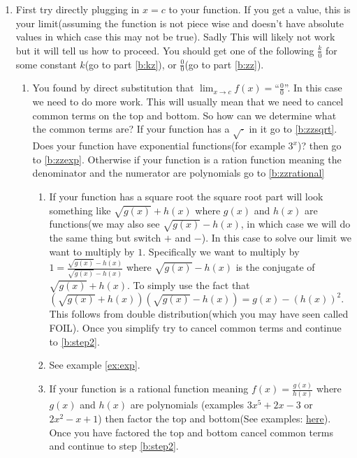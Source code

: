 \documentclass[12pt]{article}
\begin{document}
\begin{enumerate}
    \item \label{b:step1} First try directly plugging in $x=c$ to your function. If you get a value, this is your limit(assuming the function is not piece wise and doesn't have absolute values in which case this may not be true). Sadly This will likely not work but it will tell us how to proceed. You should get one of the following $\frac{k}{0}$ for some constant $k$(go to part \ref{b:kz}), or $\frac{0}{0}$(go to part \ref{b:zz}).
    \begin{enumerate}[label=\alph*.]
        \item \label{b:zz} You found by direct substitution that $\displaystyle{\lim_{x\to c}f(x)}=$``$\frac{0}{0}$''. In this case we need to do more work. This will usually mean that we need to cancel common terms on the top and bottom. So how can we determine what the common terms are? If your function has a $\sqrt{\cdot}$ in it go to \ref{b:zzsqrt}. Does your function have exponential functions(for example $3^x$)? then go to \ref{b:zzexp}. Otherwise if your function is a ration function meaning the denominator and the numerator are polynomials go to \ref{b:zzrational}
        \begin{enumerate}[label=\roman*.]
            \item \label{b:zzsqrt}
                If your function has a square root the square root part will look something like $\sqrt{g(x)}+ h(x)$ where $g(x)$ and $h(x)$ are functions(we may also see $\sqrt{g(x)}- h(x)$, in which case we will do the same thing but switch $+$ and $-$).
                In this case to solve our limit we want to multiply by $1$. Specifically we want to multiply by $1=\frac{\sqrt{g(x)}- h(x)}{\sqrt{g(x)}- h(x)}$ where $\sqrt{g(x)}- h(x)$ is the conjugate of $\sqrt{g(x)}+ h(x)$. To simply use the fact that $(\sqrt{g(x)}+ h(x))(\sqrt{g(x)}- h(x))=g(x)- (h(x))^2$. This follows from double distribution(which you may have seen called FOIL). Once you simplify try to cancel common terms and continue to \ref{b:step2}.\\
            \item \label{b:zzexp}
                See example \ref{ex:exp}.\\
            \item \label{b:zzrational}
                If your function is a rational function meaning $f(x)=\frac{g(x)}{h(x)}$ where $g(x)$ and $h(x)$ are polynomials (examples $3x^5+2x-3$ or $2x^2-x+1$) then factor the top and bottom(See examples: \href{https://tutorial.math.lamar.edu/problems/alg/factoring.aspx}{here}). Once you have factored the top and bottom cancel common terms and continue to step \ref{b:step2}.\\
        \end{enumerate}


\end{enumerate}
\end{enumerate}
\end{document}
